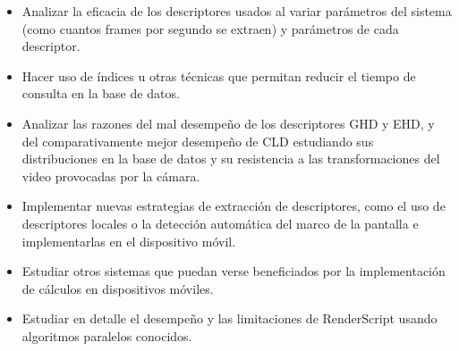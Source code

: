 \begin{itemize}
\item Analizar la eficacia de los descriptores usados al variar parámetros del sistema (como cuantos frames por segundo se extraen) y parámetros de cada descriptor.
\item Hacer uso de índices u otras técnicas que permitan reducir el tiempo de consulta en la base de datos.
\item Analizar las razones del mal desempeño de los descriptores GHD y EHD, y del comparativamente mejor desempeño de CLD estudiando sus distribuciones en la base de datos y su resistencia a las transformaciones del video provocadas por la cámara.
\item Implementar nuevas estrategias de extracción de descriptores, como el uso de descriptores locales o la detección automática del marco de la pantalla e implementarlas en el dispositivo móvil.
\item Estudiar otros sistemas que puedan verse beneficiados por la implementación de cálculos en dispositivos móviles.
\item Estudiar en detalle el desempeño y las limitaciones de RenderScript usando algoritmos paralelos conocidos.
\end{itemize}

